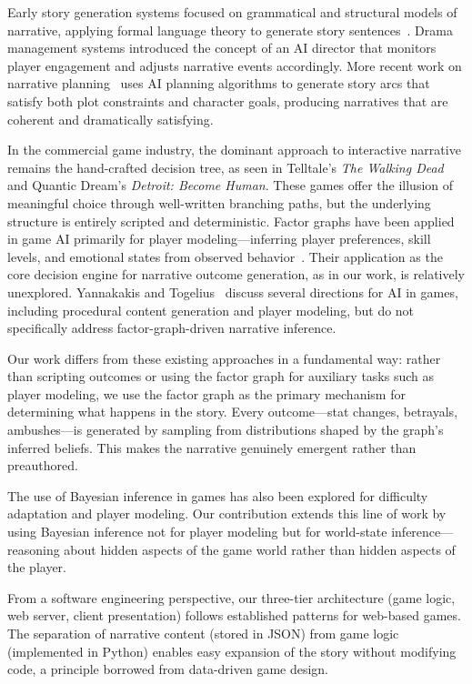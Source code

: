 \documentclass[journal]{IEEEtran}
\begin{document}
Early story generation systems focused on grammatical and structural models of narrative, applying formal language theory to generate story sentences~\cite{ref1}. Drama management systems introduced the concept of an AI director that monitors player engagement and adjusts narrative events accordingly. More recent work on narrative planning~\cite{ref7} uses AI planning algorithms to generate story arcs that satisfy both plot constraints and character goals, producing narratives that are coherent and dramatically satisfying.

In the commercial game industry, the dominant approach to interactive narrative remains the hand-crafted decision tree, as seen in Telltale's \textit{The Walking Dead} and Quantic Dream's \textit{Detroit: Become Human}. These games offer the illusion of meaningful choice through well-written branching paths, but the underlying structure is entirely scripted and deterministic. Factor graphs have been applied in game AI primarily for player modeling---inferring player preferences, skill levels, and emotional states from observed behavior~\cite{ref8}. Their application as the core decision engine for narrative outcome generation, as in our work, is relatively unexplored. Yannakakis and Togelius~\cite{ref8} discuss several directions for AI in games, including procedural content generation and player modeling, but do not specifically address factor-graph-driven narrative inference.

Our work differs from these existing approaches in a fundamental way: rather than scripting outcomes or using the factor graph for auxiliary tasks such as player modeling, we use the factor graph as the primary mechanism for determining what happens in the story. Every outcome---stat changes, betrayals, ambushes---is generated by sampling from distributions shaped by the graph's inferred beliefs. This makes the narrative genuinely emergent rather than preauthored.

The use of Bayesian inference in games has also been explored for difficulty adaptation and player modeling. Our contribution extends this line of work by using Bayesian inference not for player modeling but for world-state inference---reasoning about hidden aspects of the game world rather than hidden aspects of the player.

From a software engineering perspective, our three-tier architecture (game logic, web server, client presentation) follows established patterns for web-based games. The separation of narrative content (stored in JSON) from game logic (implemented in Python) enables easy expansion of the story without modifying code, a principle borrowed from data-driven game design.
\end{document}
